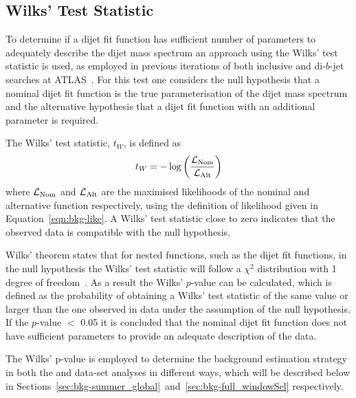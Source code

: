 \vspace{1em}
\subsection{Wilks' Test Statistic} 
\label{sec:bkg-wilks}

To determine if a dijet fit function has sufficient number of parameters to adequately describe the dijet mass spectrum an approach using the Wilks' test statistic is used,
as employed in previous iterations of both inclusive and di-$b$-jet searches at ATLAS~\cite{dijet-mori16_paper,dibjet-mori16_paper}.
For this test one considers the null hypothesis that a nominal dijet fit function is the true parameterisation of the dijet mass spectrum
and the alternative hypothesis that a dijet fit function with an additional parameter is required.

\noindent
The Wilks' test statistic, $t_W$, is defined as
\begin{equation}
  t_{W} = -\log{\left(\frac{\ensuremath{\mathcal{L}}_{\text{Nom}}}{\ensuremath{\mathcal{L}}_{\text{Alt}}}\right)}  \label{eqn:bkg-wilks}
\end{equation}
where $\mathcal{L}_{\text{Nom}}$ and $\mathcal{L}_{\text{Alt}}$ are the maximised likelihoods of the nominal and alternative function respectively,
using the definition of likelihood given in Equation~\ref{eqn:bkg-like}.
A Wilks' test statistic close to zero indicates that the observed data is compatible with the null hypothesis.

Wilks' theorem states that for nested functions, such as the dijet fit functions,
in the null hypothesis the Wilks' test statistic will follow a $\chi^2$ distribution with 1 degree of freedom~\cite{dibjet-wilks}.
As a result the Wilks' $p$-value can be calculated, which is defined as the probability of obtaining a
Wilks' test statistic of the same value or larger than the one observed in data under the assumption of the null hypothesis.
If the \mbox{$p$-value} $<$ 0.05 it is concluded that the nominal dijet fit function does not have sufficient
parameters to provide an adequate description of the data.

The Wilks' p-value is employed to determine the background estimation strategy
in both the \summer{} and \lm{} data-set analyses in different ways,
which will be described below in Sections~\ref{sec:bkg-summer_global}~and~\ref{sec:bkg-full_windowSel} respectively.


